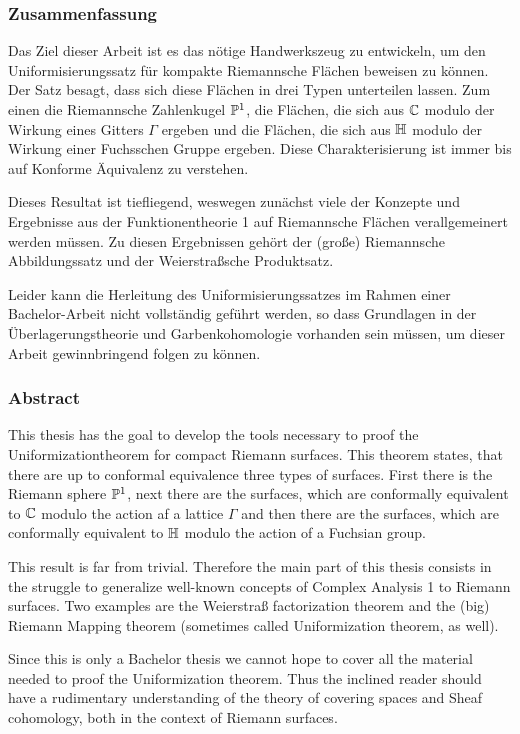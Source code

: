 
\subsubsection*{Zusammenfassung}
\label{sec:Zusammenfassung}

Das Ziel dieser Arbeit ist es das nötige Handwerkszeug zu
entwickeln, um den Uniformisierungssatz für kompakte Riemannsche
Flächen beweisen zu können. Der Satz besagt, dass sich diese
Flächen in drei Typen unterteilen lassen. Zum einen die Riemannsche
Zahlenkugel $\P^1$, die Flächen, die sich aus $\C$ modulo der
Wirkung eines Gitters $\Gamma$ ergeben und die Flächen, die sich aus
$\h$ modulo der Wirkung einer Fuchsschen Gruppe
ergeben. Diese Charakterisierung ist immer bis auf Konforme
Äquivalenz zu verstehen.

Dieses Resultat ist tiefliegend, weswegen zunächst viele der
Konzepte und Ergebnisse aus der Funktionentheorie 1 auf
Riemannsche Flächen verallgemeinert werden müssen. Zu diesen
Ergebnissen gehört der (große) Riemannsche Abbildungssatz und der
Weierstraßsche Produktsatz.

Leider kann die Herleitung des Uniformisierungssatzes im Rahmen
einer Bachelor-Arbeit nicht vollständig geführt werden, so dass
Grundlagen in der Überlagerungstheorie und Garbenkohomologie
vorhanden sein müssen, um dieser Arbeit gewinnbringend folgen zu können.

\subsubsection*{Abstract}
\label{sec:abstract}

This thesis has the goal to develop the tools necessary to proof the
Uniformizationtheorem for compact Riemann surfaces. This theorem
states, that there are up to conformal equivalence three types of
surfaces. First there is the Riemann sphere $\P^1$, next there are the
surfaces, which are conformally equivalent to $\C$ modulo the action
af a lattice $\Gamma$ and then there are the surfaces, which are
conformally equivalent to $\h$ modulo the action of a Fuchsian group.


This result is far from trivial. Therefore the main part of this
thesis consists in the struggle to generalize well-known concepts of
Complex Analysis 1 to Riemann surfaces. Two examples are the
Weierstraß factorization theorem and the (big) Riemann Mapping theorem
(sometimes called Uniformization theorem, as well).

Since this is only a Bachelor thesis we cannot hope to cover all the
material needed to proof the Uniformization theorem. Thus the inclined
reader should have a rudimentary understanding of the theory of
covering spaces and Sheaf cohomology, both in the context of Riemann surfaces.

